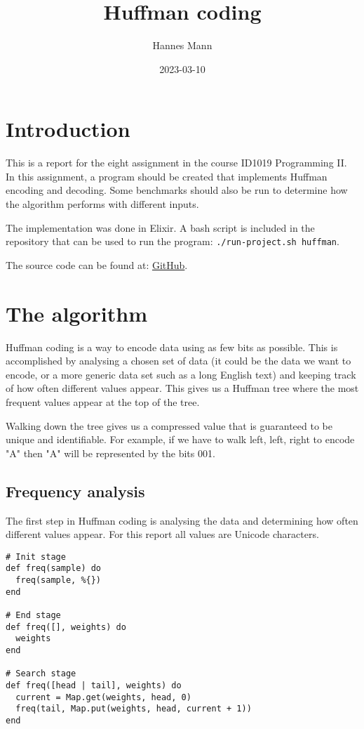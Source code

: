 \documentclass[a4paper,11pt]{article}
\begin{document}
\title{
    \textbf{Huffman coding}
}
\author{Hannes Mann}
\date{2023-03-10}

\maketitle

\section*{Introduction}

This is a report for the eight assignment in the course ID1019 Programming II.
In this assignment, a program should be created that implements Huffman encoding and decoding. Some benchmarks should also be run to determine how the algorithm performs with different inputs.

The implementation was done in Elixir. A bash script is included in the repository that can be used to run the program: \texttt{./run-project.sh huffman}.

The source code can be found at: \href{https://github.com/hannesmann/ID1019/tree/main/src/huffman}{GitHub}.

\section*{The algorithm}

Huffman coding is a way to encode data using as few bits as possible.
This is accomplished by analysing a chosen set of data (it could be the data we want to encode, or a more generic data set such as a long English text)
and keeping track of how often different values appear.
This gives us a Huffman tree where the most frequent values appear at the top of the tree.

Walking down the tree gives us a compressed value that is guaranteed to be unique and identifiable. For example, if we have to walk left, left, right to encode "A" then "A" will be represented by the bits 001.

\subsection*{Frequency analysis}

The first step in Huffman coding is analysing the data and determining how often different values appear. For this report all values are Unicode characters.

\begin{verbatim}
# Init stage
def freq(sample) do
  freq(sample, %{})
end

# End stage
def freq([], weights) do
  weights
end

# Search stage
def freq([head | tail], weights) do
  current = Map.get(weights, head, 0)
  freq(tail, Map.put(weights, head, current + 1))
end
\end{verbatim}
\end{document}
